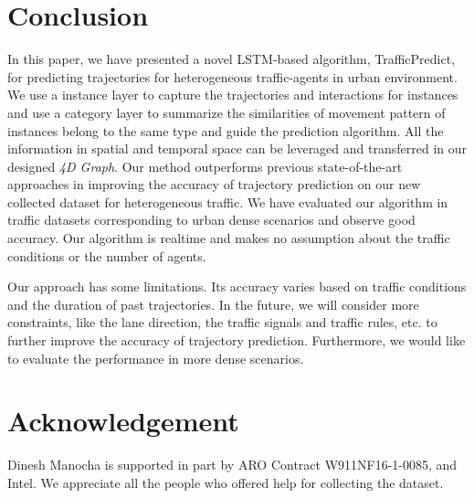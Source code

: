 \documentclass[letterpaper]{article} \usepackage{aaai19}  \usepackage{times}  \usepackage{helvet}  \usepackage{courier}  \usepackage{url}  \usepackage{graphicx}  \usepackage{amsmath}
\begin{document}
\section{Conclusion}
In this paper, we have presented a novel LSTM-based algorithm, TrafficPredict, for predicting trajectories for heterogeneous traffic-agents in urban environment.  
We use a instance layer to capture the trajectories and interactions for instances and use a category layer to summarize the similarities of movement pattern of instances belong to the same type and guide the prediction algorithm. All the information in spatial and temporal space can be leveraged and transferred in our designed \textit{4D Graph}. Our method outperforms previous state-of-the-art approaches in improving the accuracy of trajectory prediction on our new collected dataset for heterogeneous traffic. We have evaluated our algorithm in traffic datasets corresponding to urban dense scenarios and observe good accuracy. Our algorithm is realtime and makes no assumption about the traffic conditions or the number of agents.


Our approach has some limitations. Its accuracy varies based on traffic conditions and the duration of past trajectories. In the future, we will consider more constraints, like the lane direction, the traffic signals and traffic rules, etc. to further improve the accuracy of trajectory prediction. Furthermore, we would like to evaluate the performance in more dense scenarios.

\section{Acknowledgement}
Dinesh Manocha is supported in part  by ARO Contract W911NF16-1-0085, and Intel. We appreciate all the people who offered help for collecting the dataset. 

\appendix


\small


\end{document}
